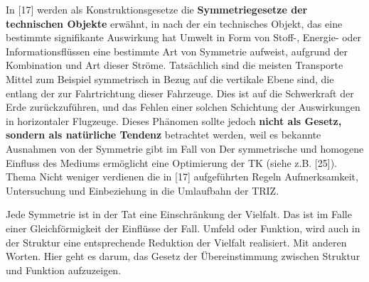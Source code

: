 \documentclass[11pt,a4paper]{article}
\begin{document}
In [17] werden als Konstruktionsgesetze die \textbf{Symmetriegesetze der
  technischen Objekte} erwähnt, in nach der ein technisches Objekt, das eine
bestimmte signifikante Auswirkung hat Umwelt in Form von Stoff-, Energie- oder
Informationsflüssen eine bestimmte Art von Symmetrie aufweist, aufgrund der
Kombination und Art dieser Ströme. Tatsächlich sind die meisten Transporte
Mittel zum Beispiel symmetrisch in Bezug auf die vertikale Ebene sind, die
entlang der zur Fahrtrichtung dieser Fahrzeuge. Dies ist auf die Schwerkraft
der Erde zurückzuführen, und das Fehlen einer solchen Schichtung der
Auswirkungen in horizontaler Flugzeuge. Dieses Phänomen sollte jedoch
\textbf{nicht als Gesetz, sondern als natürliche Tendenz} betrachtet werden,
weil es bekannte Ausnahmen von der Symmetrie gibt im Fall von Der symmetrische
und homogene Einfluss des Mediums ermöglicht eine Optimierung der TK (siehe
z.B. [25]). Thema Nicht weniger verdienen die in [17] aufgeführten Regeln
Aufmerksamkeit, Untersuchung und Einbeziehung in die Umlaufbahn der TRIZ.

Jede Symmetrie ist in der Tat eine Einschränkung der Vielfalt. Das ist im
Falle einer Gleichförmigkeit der Einflüsse der Fall.  Umfeld oder Funktion,
wird auch in der Struktur eine entsprechende Reduktion der Vielfalt
realisiert. Mit anderen Worten.  Hier geht es darum, das Gesetz der
Übereinstimmung zwischen Struktur und Funktion aufzuzeigen.
\end{document}
